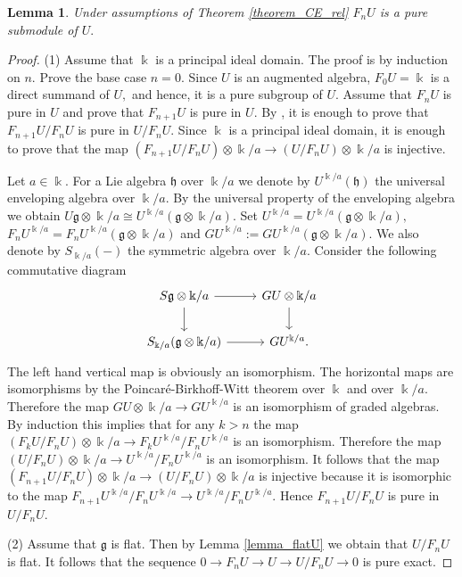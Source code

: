 \documentclass{amsart}
\numberwithin{equation}{section}
\newtheorem{lemma}[theorem]{Lemma}
\theoremstyle{definition}
\def\gg{\mathfrak{g}}
\def\kk{\Bbbk}
\begin{document}
\begin{lemma}\label{lemma_F_nU_pure} Under assumptions of Theorem \ref{theorem_CE_rel} $F_nU$ is a pure submodule of $U.$
\end{lemma} 
\begin{proof} 
(1) Assume that $\kk$ is a principal ideal domain. The proof is by induction on $n$. 
Prove the base case $n=0.$ Since $U$ is an augmented algebra,  $F_0U=\kk$ is a direct summand of $U,$ and hence,  it is a pure subgroup of $U.$  Assume that $F_nU$ is pure in $U$ and prove that $F_{n+1}U$ is pure in $U.$ By \cite[Lemma 26.1]{fuchs1970infinite}, it is enough to prove that $F_{n+1}U/F_nU$ is pure in $U/F_nU.$ Since $\kk$ is a principal ideal domain, it is enough to prove that the map $(F_{n+1}U/F_nU)\otimes \kk/a\to (U/F_nU)\otimes \kk/a$ is injective.

Let $a\in \kk.$  For a Lie algebra $\mathfrak{h}$ over $\kk/a$ we denote by $U^{\kk/a}(\mathfrak{h})$ the universal enveloping algebra over $\kk/a.$ By the universal property of the enveloping algebra we obtain $U\gg\otimes \kk/a\cong U^{\kk/a}(\gg\otimes \kk/a).$ Set $U^{\kk/a}=U^{\kk/a}(\gg\otimes \kk/a),$  $F_nU^{\kk/a}=F_nU^{\kk/a}(\gg\otimes \kk/a)$ and $GU^{\kk/a}:=GU^{\kk/a}(\gg\otimes \kk/a).$ We also denote by $S_{\kk/a}(-)$ the symmetric algebra over $\kk/a.$ Consider the following commutative diagram
$$
\begin{tikzcd}
S\gg\otimes \kk/a\arrow[r] \arrow[d] & GU\otimes \kk/a \arrow[d] \\
S_{\kk/a}(\gg\otimes \kk/a)\arrow[r] & GU^{\kk/a}.
\end{tikzcd}
$$
The left hand vertical map is obviously an isomorphism. The horizontal maps are isomorphisms by the Poincar\'e-Birkhoff-Witt theorem over $\kk$ and over $\kk/a$. Therefore the map $GU\otimes \kk/a\to GU^{\kk/a} $ is an isomorphism of graded algebras. 
By induction this implies that for any $k>n$ the map  $(F_{k}U/F_nU)\otimes \kk/a \to F_kU^{\kk/a}/F_nU^{\kk/a} $ is an isomorphism. Therefore the map $(U/F_nU)\otimes \kk/a \to U^{\kk/a}/F_nU^{\kk/a} $ is an isomorphism.  It follows that the map $(F_{n+1}U/F_nU)\otimes \kk/a\to (U/F_nU)\otimes \kk/a$  is injective because it is isomorphic to the map $F_{n+1}U^{\kk/a}/F_nU^{\kk/a} \to U^{\kk/a}/F_nU^{\kk/a}$. Hence $F_{n+1}U/F_nU$ is pure in $U/F_nU.$

(2) Assume that $\gg$ is flat. Then by Lemma \ref{lemma_flatU} we obtain that $U/F_nU$ is flat. It follows that the sequence $0\to F_nU \to U \to U/F_nU\to 0$ is pure exact. 
\end{proof}
\end{document}
